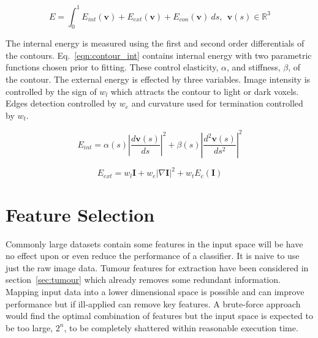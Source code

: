 \documentclass[journal]{IEEEtran}
\begin{document}
\begin{equation}
	E = \int_0^{1} E_{int}(\mathbf{v}) + E_{ext}(\mathbf{v}) + E_{con}(\mathbf{v})\:ds,\:\:\mathbf{v}(s) \in \mathbb{R}^3
	\label{eqn:contour_v}
\end{equation}

The internal energy is measured using the first and second order differentials of the contours.
Eq.~\eqref{eqn:contour_int} contains internal energy with two parametric functions chosen prior to fitting.
These control elasticity, $\alpha$, and stiffness, $\beta$, of the contour.
The external energy is effected by three variables.
Image intensity is controlled by the sign of $w_l$ which attracts the contour to light or dark voxels.
Edges detection controlled by $w_e$ and curvature used for termination controlled by $w_t$. 

\begin{equation}
	 E_{int}= \alpha(s)\left|\frac{d\mathbf{v}(s)}{ds}\right|^2 + \beta(s)\left|\frac{d^2\mathbf{v}(s)}{ds^2}\right|^2 
	 \label{eqn:contour_int}
\end{equation}

\begin{equation}
	 E_{ext}= w_{l}\mathbf{I} + w_{e}|\nabla \mathbf{I}|^2 + w_{t}E_c(\mathbf{I})
	 \label{eqn:contour_int}
\end{equation}















\section{Feature Selection}
\label{sec:selection}

Commonly large datasets contain some features in the input space will be have no effect upon or even reduce the performance of a classifier.
It is naive to use just the raw image data.
Tumour features for extraction have been considered in section~\ref{sec:tumour} which already removes some redundant information. 
Mapping input data into a lower dimensional space is possible and can improve performance but if ill-applied can remove key features.
A brute-force approach would find the optimal combination of features but the input space is expected to be too large, $2^n$, to be completely shattered within reasonable execution time. 
\end{document}
